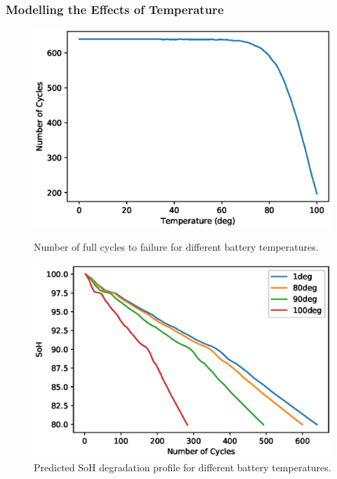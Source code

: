 \documentclass[a4paper, 10pt]{article}
\numberwithin{equation}{section}
\begin{document}
\subsubsection{Modelling the Effects of Temperature}
\begin{figure}[h]
\centering
\begin{minipage}{.5\textwidth}
  \centering
    \includegraphics[width=0.95\linewidth]{images/F4_cycles_vs_temp.eps}
    \caption{Number of full cycles to failure for different battery temperatures.}
    \label{fig:temp}
\end{minipage}%
\begin{minipage}{.5\textwidth}
  \centering
    \includegraphics[width=0.95\linewidth]{images/F5_SoH_T.eps}
    \caption{Predicted SoH degradation profile for different battery temperatures.}
    \label{fig:SoHT}
\end{minipage}
\end{figure}
\end{document}
